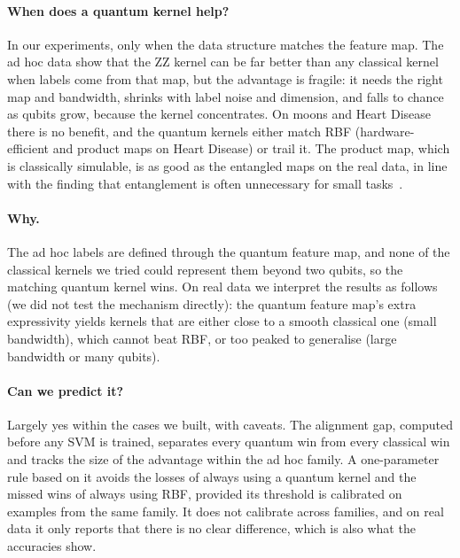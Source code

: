\documentclass[11pt,a4paper]{article}
\begin{document}
\paragraph{When does a quantum kernel help?} In our experiments, only when the data structure matches the feature map. The ad hoc data show that the ZZ kernel can be far better than any classical kernel when labels come from that map, but the advantage is fragile: it needs the right map and bandwidth, shrinks with label noise and dimension, and falls to chance as qubits grow, because the kernel concentrates. On moons and Heart Disease there is no benefit, and the quantum kernels either match RBF (hardware-efficient and product maps on Heart Disease) or trail it. The product map, which is classically simulable, is as good as the entangled maps on the real data, in line with the finding that entanglement is often unnecessary for small tasks~\cite{bowles2024}.

\paragraph{Why.} The ad hoc labels are defined through the quantum feature map, and none of the classical kernels we tried could represent them beyond two qubits, so the matching quantum kernel wins. On real data we interpret the results as follows (we did not test the mechanism directly): the quantum feature map's extra expressivity yields kernels that are either close to a smooth classical one (small bandwidth), which cannot beat RBF, or too peaked to generalise (large bandwidth or many qubits).

\paragraph{Can we predict it?} Largely yes within the cases we built, with caveats. The alignment gap, computed before any SVM is trained, separates every quantum win from every classical win and tracks the size of the advantage within the ad hoc family. A one-parameter rule based on it avoids the losses of always using a quantum kernel and the missed wins of always using RBF, provided its threshold is calibrated on examples from the same family. It does not calibrate across families, and on real data it only reports that there is no clear difference, which is also what the accuracies show.
\end{document}
